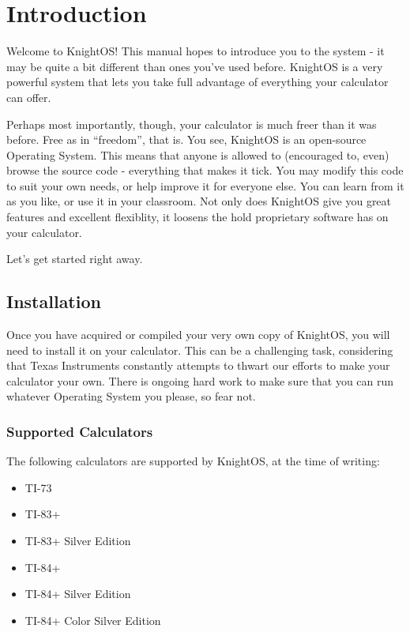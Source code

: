 \chapter{Introduction}

Welcome to KnightOS! This manual hopes to introduce you to the system - it may be
quite a bit different than ones you've used before. KnightOS is a very powerful
system that lets you take full advantage of everything your calculator can offer.

Perhaps most importantly, though, your calculator is much freer than it was
before. Free as in ``freedom'', that is. You see, KnightOS is an open-source
Operating System. This means that anyone is allowed to (encouraged to, even)
browse the source code - everything that makes it tick. You may modify this code
to suit your own needs, or help improve it for everyone else. You can learn from
it as you like, or use it in your classroom. Not only does KnightOS give you great
features and excellent flexiblity, it loosens the hold proprietary software has on
your calculator.

Let's get started right away.

\section{Installation}

Once you have acquired or compiled your very own copy of KnightOS, you will need
to install it on your calculator. This can be a challenging task, considering that
Texas Instruments constantly attempts to thwart our efforts to make your
calculator your own. There is ongoing hard work to make sure that you can run
whatever Operating System you please, so fear not.

\subsection{Supported Calculators}

The following calculators are supported by KnightOS, at the time of writing:

\begin{itemize}
    \item TI-73
    \item TI-83+
    \item TI-83+ Silver Edition
    \item TI-84+
    \item TI-84+ Silver Edition
    \item TI-84+ Color Silver Edition
\end{itemize}

